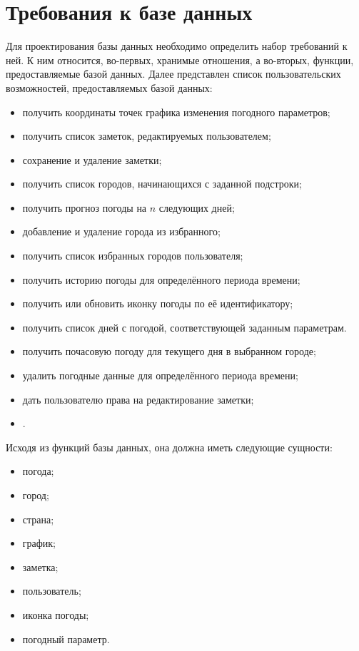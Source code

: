 \section{Требования к базе данных}
Для проектирования базы данных необходимо определить набор требований к ней.
К ним относится, во-первых, хранимые отношения, а во-вторых, функции, предоставляемые базой данных.
Далее представлен список пользовательских возможностей, предоставляемых базой данных:
\begin{itemize}
    \item получить координаты точек графика изменения погодного параметров;
    \item получить список заметок, редактируемых пользователем;
    \item сохранение и удаление заметки;
    \item получить список городов, начинающихся с заданной подстроки;
    \item получить прогноз погоды на $n$ следующих дней;
    \item добавление и удаление города из избранного;
    \item получить список избранных городов пользователя;
    \item получить историю погоды для определённого периода времени;
    \item получить или обновить иконку погоды по её идентификатору;
    \item получить список дней с погодой, соответствующей заданным параметрам.
    \item получить почасовую погоду для текущего дня в выбранном городе;
    \item удалить погодные данные для определённого периода времени;
    \item дать пользователю права на редактирование заметки;
    \item .
\end{itemize}
Исходя из функций базы данных, она должна иметь следующие сущности:
\begin{itemize}
    \item погода;
    \item город;
    \item страна;
    \item график;
    \item заметка;
    \item пользователь;
    \item иконка погоды;
    \item погодный параметр.
\end{itemize}
